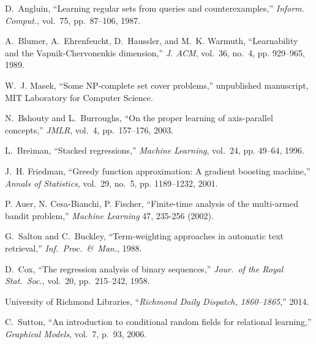 \documentclass[10pt,conference,compsocconf]{IEEEtran}
\begin{document}
\begin{small}
\begin{thebibliography}{10}
D.~Angluin, ``Learning regular sets from queries and counterexamples,''
  \emph{Inform. Comput.}, vol.~75, pp.~87--106, 1987.

A.~Blumer, A.~Ehrenfeucht, D.~Haussler, and M.~K. Warmuth, ``Learnability and
  the {V}apnik-{C}hervonenkis dimension,'' \emph{J. ACM}, vol.~36, no.~4, pp.
  929--965, 1989.

W.~J. Masek, ``Some {NP}-complete set cover problems,'' unpublished manuscript,
  {MIT} Laboratory for Computer Science.

N.~Bshouty and L.~Burroughs, ``On the proper learning of axis-parallel
  concepts,'' \emph{JMLR}, vol.~4, pp.~157--176, 2003.

L.~Breiman, ``{Stacked regressions},'' \emph{Machine Learning}, vol.~24, pp. 49--64, 1996.

J.~H. Friedman, ``{Greedy function approximation: A gradient boosting
  machine},'' \emph{Annals of Statistics}, vol.~29, no.~5, pp. 1189--1232,
  2001.

P. Auer, N. Cesa-Bianchi, P. Fischer, ``{Finite-time analysis of the multi-armed bandit problem},'' \emph{Machine Learning} 47, 235-256 (2002).

G.~Salton and C.~Buckley, ``{Term-weighting approaches in automatic text
  retrieval},'' \emph{Inf.~Proc.~\&~Man.}, 1988. %

D.~Cox, ``{The regression analysis of binary sequences},'' \emph{Jour.~of the
  Royal Stat.~Soc.}, vol.~20, pp.~215--242, 1958.

{University of Richmond Libraries}, ``{\em {Richmond} {Daily} {Dispatch},
  1860--1865},'' 2014. %

C.~Sutton, ``{An introduction to conditional random fields for relational
  learning},'' \emph{Graphical Models}, vol.~7, p.~93, 2006. %


\end{thebibliography}
\end{small}
\end{document}
